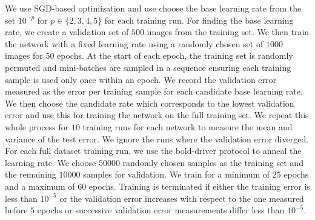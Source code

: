 \documentclass{article} %
\newcommand{\changeBM}[1]{#1} %
\newcommand{\changeVB}[1]{#1} %
\begin{document}
We use SGD-based optimization and use choose the base learning rate from the set $10^{-p}$ \changeBM{for $p \in \{2, 3, 4, 5\}$} for each training run. For finding the base learning rate, we create a validation set of $500$ images from the training set. We then train the network with a fixed learning rate using a randomly chosen set of $1000$ images for $50$ epochs. At the start of each epoch, the training set is randomly permuted and mini-batches are sampled in a sequence ensuring each training sample is used only once within an epoch. We record the validation error measured as the error per training sample for each candidate base learning rate. We then choose the candidate rate which corresponds to the lowest validation error and use this for training the network on the full training set. We repeat this whole process for $10$ training runs for each network to measure the mean and variance of the test error. \changeBM{We ignore the runs where the validation error diverged.} \changeVB{For each full dataset training run, we use the bold-driver protocol \cite{HintonBoldDriver} to anneal the learning rate.} We choose $50000$ randomly chosen samples as the training set and the remaining $10000$ samples for validation. We train for a minimum of $25$ epochs and a maximum of $60$ epochs. Training is terminated if either the training error is less than $10^{-5}$ or the validation error increases with respect to the one measured before $5$ epochs or successive validation error measurements differ less than $10^{-5}$. 



%
\end{document}

